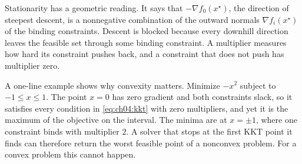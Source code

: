 Stationarity has a geometric reading. It says that $-\nabla f_0(x^\star)$, the direction of steepest descent, is a nonnegative combination of the outward normals $\nabla f_i(x^\star)$ of the binding constraints. Descent is blocked because every downhill direction leaves the feasible set through some binding constraint. A multiplier measures how hard its constraint pushes back, and a constraint that does not push has multiplier zero.

A one-line example shows why convexity matters. Minimize $-x^2$ subject to $-1\le x\le1$. The point $x=0$ has zero gradient and both constraints slack, so it satisfies every condition in \eqref{eq:ch04:kkt} with zero multipliers, and yet it is the maximum of the objective on the interval. The minima are at $x=\pm1$, where one constraint binds with multiplier $2$. A solver that stops at the first KKT point it finds can therefore return the worst feasible point of a nonconvex problem. For a convex problem this cannot happen.


